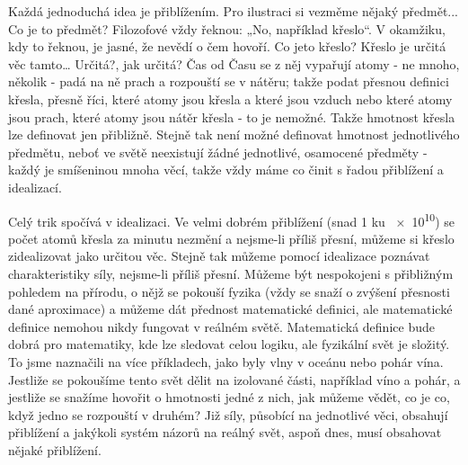     Každá jednoduchá idea je přiblížením. Pro ilustraci si vezměme nějaký předmět... Co je to 
    předmět? Filozofové vždy řeknou: „No, například křeslo“. V okamžiku, kdy to řeknou, je jasné, 
    že nevědí o čem hovoří. Co jeto křeslo? Křeslo je určitá věc tamto… Určitá?, jak určitá? Čas od 
    Času se z něj vypařují atomy - ne mnoho, několik - padá na ně prach a rozpouští se v nátěru; 
    takže podat přesnou definici křesla, přesně říci, které atomy jsou křesla a které jsou vzduch 
    nebo které atomy jsou prach, které atomy jsou nátěr křesla - to je nemožné. Takže hmotnost 
    křesla lze definovat jen přibližně. Stejně tak není možné definovat hmotnost jednotlivého 
    předmětu, neboť ve světě neexistují žádné jednotlivé, osamocené předměty - každý je smíšeninou 
    mnoha věcí, takže vždy máme co činit s řadou přiblížení a idealizací.
    
    Celý trik spočívá v idealizaci. Ve velmi dobrém přiblížení (snad 1 ku \num{e10}) se počet atomů 
    křesla za minutu nezmění a nejsme-li příliš přesní, můžeme si křeslo zidealizovat jako určitou 
    věc. Stejně tak můžeme pomocí idealizace poznávat charakteristiky síly, nejsme-li příliš 
    přesní. Můžeme být nespokojeni s přibližným pohledem na přírodu, o nějž se pokouší fyzika (vždy 
    se snaží o zvýšení přesnosti dané aproximace) a můžeme dát přednost matematické definici, ale 
    matematické definice nemohou nikdy fungovat v reálném světě. Matematická definice bude dobrá 
    pro matematiky, kde lze sledovat celou logiku, ale fyzikální svět je složitý. To jsme naznačili 
    na více příkladech, jako byly vlny v oceánu nebo pohár vína. Jestliže se pokoušíme tento svět 
    dělit na izolované části, například víno a pohár, a jestliže se snažíme hovořit o hmotnosti 
    jedné z nich, jak můžeme vědět, co je co, když jedno se rozpouští v druhém? Již síly, působící 
    na jednotlivé věci, obsahují přiblížení a jakýkoli systém názorů na reálný svět, aspoň dnes, 
    musí obsahovat nějaké přiblížení.
    
